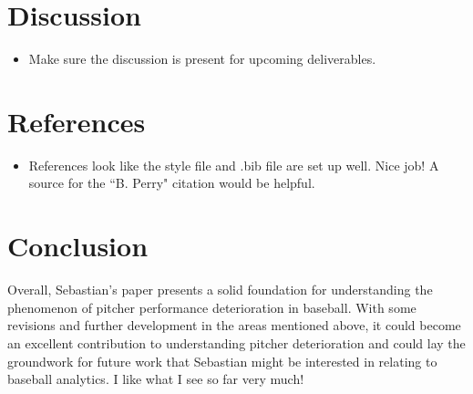 \documentclass[12pt]{article}
\begin{document}
\section*{Discussion}

\begin{itemize}
    \item Make sure the discussion is present for upcoming deliverables.
\end{itemize}

\section*{References}

\begin{itemize}
    \item References look like the style file and .bib file are set up well. Nice job! A source for the ``B. Perry" citation would be helpful.
\end{itemize}

\section*{Conclusion}

Overall, Sebastian’s paper presents a solid foundation for understanding the phenomenon of pitcher performance deterioration in baseball. With some revisions and further development in the areas mentioned above, it could become an excellent contribution to understanding pitcher deterioration and could lay the groundwork for future work that Sebastian might be interested in relating to baseball analytics. I like what I see so far very much!
\end{document}
